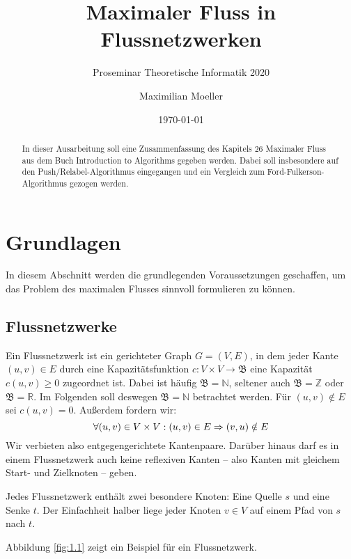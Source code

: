 \documentclass[12pt,a4paper,titlepage,onecolumn,ngerman]{scrartcl}
\author{Maximilian Moeller}
\title{Maximaler Fluss in Flussnetzwerken}
\subtitle{Proseminar Theoretische Informatik 2020}
\date{\today}
\newcommand{\ff}{Ford-Fulkerson}
\newcommand{\pr}{Push/Relabel}
\begin{document}
\maketitle
\nocite{Cormen09}

\tableofcontents

\begin{abstract}
In dieser Ausarbeitung soll eine Zusammenfassung des Kapitels 26 \glqq Maximaler Fluss\grqq{} aus dem Buch \glqq Introduction to Algorithms \grqq{} \citep{Cormen09} gegeben werden. 
Dabei soll insbesondere auf den \pr -Algorithmus eingegangen und ein Vergleich zum \ff -Algorithmus gezogen werden.
\end{abstract}

\section{Grundlagen}
In diesem Abschnitt werden die grundlegenden Voraussetzungen geschaffen, um das Problem des maximalen Flusses sinnvoll formulieren zu können.

\subsection{Flussnetzwerke}
Ein Flussnetzwerk ist ein gerichteter Graph $G = (V,E)$, in dem jeder Kante $(u,v) \in E$ durch eine Kapazitätsfunktion $c: V\times V\to\mathfrak{B}$ eine Kapazität $c(u,v) \geq 0$ zugeordnet ist.
Dabei ist häufig $\mathfrak{B} = \mathbb{N}$, seltener auch $\mathfrak{B} = \mathbb{Z}$ oder $\mathfrak{B} = \mathbb{R}$.
Im Folgenden soll deswegen $\mathfrak{B} = \mathbb{N}$ betrachtet werden.
Für $(u,v) \notin E$ sei $c(u,v) = 0$.
Außerdem fordern wir:
\begin{equation} \label{no_parallel}
\forall (u,v)\in V\times V: (u,v)\in E \Rightarrow (v,u)\notin E\\
\end{equation}
Wir verbieten also entgegengerichtete Kantenpaare.
Darüber hinaus darf es in einem Flussnetzwerk auch keine reflexiven Kanten -- also Kanten mit gleichem Start- und Zielknoten -- geben.

Jedes Flussnetzwerk enthält zwei besondere Knoten: Eine Quelle $s$ und eine Senke $t$.
Der Einfachheit halber liege jeder Knoten $v \in V$ auf einem Pfad von $s$ nach $t$.

Abbildung \ref{fig:1.1} zeigt ein Beispiel für ein Flussnetzwerk.
\end{document}
